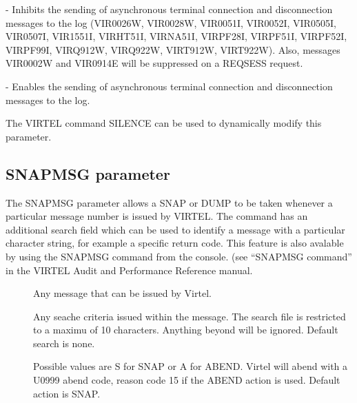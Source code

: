 \documentclass[letterpaper,10pt,english]{sphinxmanual}
\begin{document}
 - Inhibits the sending of asynchronous terminal connection and disconnection messages to the log (VIR0026W, VIR0028W, VIR0051I, VIR0052I, VIR0505I, VIR0507I, VIR1551I, VIRHT51I, VIRNA51I, VIRPF28I, VIRPF51I, VIRPF52I, VIRPF99I, VIRQ912W, VIRQ922W, VIRT912W, VIRT922W). Also, messages VIR0002W and VIR0914E will be suppressed on a REQSESS request.

 - Enables the sending of asynchronous terminal connection and disconnection messages to the log.

The VIRTEL command SILENCE can be used to dynamically modify this parameter.

\ignorespaces 

\subsection{SNAPMSG parameter}
\label{\detokenize{Installation_Guide:snapmsg-parameter}}\label{\detokenize{Installation_Guide:index-114}}
\begin{sphinxVerbatim}[commandchars=\\\{\}]
\end{sphinxVerbatim}

The SNAPMSG parameter allows a SNAP or DUMP to be taken whenever a particular message number is issued by VIRTEL. The command has an additional search field which can be used to identify a message with a particular character string, for example a specific return code. This feature is also avalable by using the SNAPMSG command from the console. (see “SNAPMSG command” in the VIRTEL Audit and Performance Reference manual.
\begin{description}
\item[{}] \leavevmode
Any message that can be issued by Virtel.

\item[{}] \leavevmode
Any seache criteria issued within the message. The search file is restricted to a maximu of 10 characters. Anything beyond will be ignored. Default search is none.

\item[{}] \leavevmode
Possible values are S for SNAP or A for ABEND. Virtel will abend with a U0999 abend code, reason code 15 if the ABEND action is used. Default action is SNAP.

\end{description}
\end{document}
